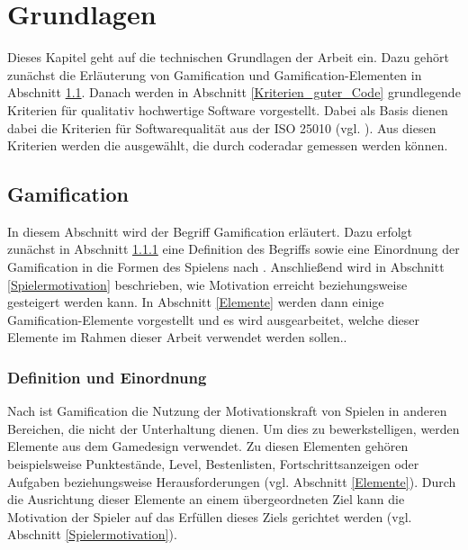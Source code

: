 \documentclass[
	oneside,  %
	ngerman, 
	final, 
	11pt, 
	a4paper, 
	1.1headlines, 
	headinclude=false, 
	footinclude=false, 
	mpinclude=false, 
	pagesize, 
	onecolumn, 
	titlepage, 
	parskip=half, 
	headsepline, 
	chapterprefix=false, 
	version=first, 
	listof=totoc, 
	bibliography=totoc, 
	toc=graduated, 
	fleqn
]{scrbook}
\begin{document}
\chapter{Grundlagen}
\label{Technische_Grundlagen}
Dieses Kapitel geht auf die technischen Grundlagen der Arbeit ein.
Dazu gehört zunächst die Erläuterung von Gamification und Gamification-Elementen in Abschnitt \ref{Gamification}.
Danach werden in Abschnitt \ref{Kriterien_guter_Code} grundlegende Kriterien für qualitativ hochwertige Software vorgestellt.
Dabei als Basis dienen dabei die Kriterien für Softwarequalität aus der \acs{ISO} 25010 (vgl. \cite{ISO-25010}).
Aus diesen Kriterien werden die ausgewählt, die durch coderadar gemessen werden können. 

\section{Gamification}
\label{Gamification}
In diesem Abschnitt wird der Begriff Gamification erläutert.
Dazu erfolgt zunächst in Abschnitt \ref{Definition} eine Definition des Begriffs sowie eine Einordnung der Gamification in die Formen des Spielens nach \cite{DD2011}.
Anschließend wird in Abschnitt \ref{Spielermotivation} beschrieben, wie Motivation erreicht beziehungsweise gesteigert werden kann.
In Abschnitt \ref{Elemente} werden dann einige Gamification-Elemente vorgestellt und es wird ausgearbeitet, welche dieser Elemente im Rahmen dieser Arbeit verwendet werden sollen..

\subsection{Definition und Einordnung}
\label{Definition}
Nach \cite{SH2014} ist Gamification die Nutzung der Motivationskraft von Spielen in anderen Bereichen, die nicht der Unterhaltung dienen.
Um dies zu bewerkstelligen, werden Elemente aus dem Gamedesign verwendet.
Zu diesen Elementen gehören beispielsweise Punktestände, Level, Bestenlisten, Fortschrittsanzeigen oder Aufgaben beziehungsweise Herausforderungen (vgl. Abschnitt \ref{Elemente}).
Durch die Ausrichtung dieser Elemente an einem übergeordneten Ziel kann die Motivation der Spieler auf das Erfüllen dieses Ziels gerichtet werden (vgl. Abschnitt \ref{Spielermotivation}).
\end{document}
